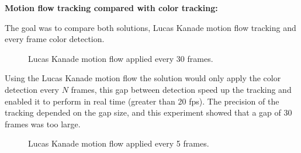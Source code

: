 \documentclass[10pt,twocolumn,letterpaper]{article}
\begin{document}
  \bigbreak{}
  \textbf{Motion flow tracking compared with color tracking:}
  \bigbreak{}

  The goal was to compare both solutions, Lucas Kanade motion flow tracking and
  every frame color detection.

  \begin{figure}[!h]
    \centering
    \setlength{\fboxsep}{1pt}
    \setlength{\fboxrule}{1pt}
    \caption{Lucas Kanade motion flow applied every 30 frames.}\label{fig:motion_30}
  \end{figure}

  Using the Lucas Kanade motion flow the solution would only apply the color
  detection every $N$ frames, this gap between detection speed up the tracking
  and enabled it to perform in real time (greater than 20 fps). The precision of
  the tracking depended on the gap size, and this experiment showed that a gap
  of 30 frames was too large.

  \begin{figure}[!h]
    \centering
    \setlength{\fboxsep}{1pt}
    \setlength{\fboxrule}{1pt}
    \caption{Lucas Kanade motion flow applied every 5 frames.}\label{fig:motion_5}
  \end{figure}
\end{document}
